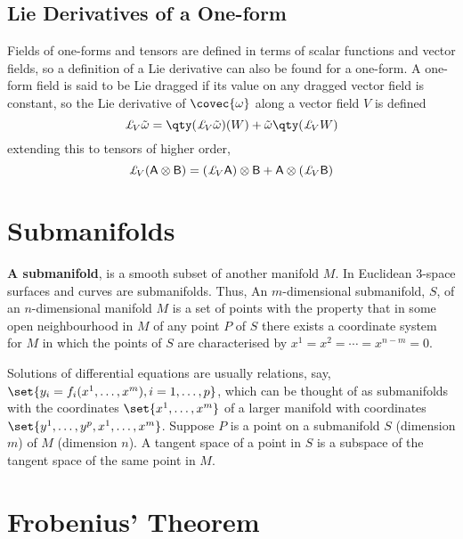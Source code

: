 \subsection{Lie Derivatives of a One-form}
\label{sec:lie-derivatives-one}

Fields of one-forms and tensors are defined in terms of scalar
functions and vector fields, so a definition of a Lie derivative can
also be found for a one-form. A one-form field is said to be Lie
dragged if its value on any dragged vector field is constant, so the
Lie derivative of $\covec{\omega}$ along a vector field $V$ is defined
\begin{equation}
  \label{eq:23}
  \ld{V}{\of{\omega}} = \qty(\ld{V}{\of{\omega}})(W) + \of{\omega} \qty(\ld{V}{W})
\end{equation}
extending this to tensors of higher order,
\begin{equation}
  \label{eq:24}
  \ld{V}{(\ten{A} \otimes \ten{B})} = (\ld{V}{\ten{A}}) \otimes \ten{B} + \ten{A} \otimes (\ld{V}{\ten{B}})
\end{equation}

\section{Submanifolds}
\label{sec:submanifolds}

\textbf{A submanifold}, is a smooth subset of another manifold $M$. In
Euclidean 3-space surfaces and curves are submanifolds. Thus, An
$m$-dimensional submanifold, $S$, of an $n$-dimensional manifold $M$
is a set of points with the property that in some open neighbourhood
in $M$ of any point $P$ of $S$ there exists a coordinate system for
$M$ in which the points of $S$ are characterised by $x^1 = x^2 =
\cdots = x^{n-m} = 0$.

Solutions of differential equations are usually relations, say,
$\set{y_i = f_i(x^1, \dots, x^m), i=1, \dots, p}$, which can be
thought of as submanifolds with the coordinates $\set{x^1, \dots,
  x^m}$ of a larger manifold with coordinates $\set{y^1, \dots, y^p,
  x^1, \dots, x^m}$. Suppose $P$ is a point on a submanifold $S$
(dimension $m$) of $M$ (dimension $n$). A tangent space of a point in
$S$ is a subspace of the tangent space of the same point in $M$.

\section{Frobenius' Theorem}
\label{sec:frobenius-theorem}

